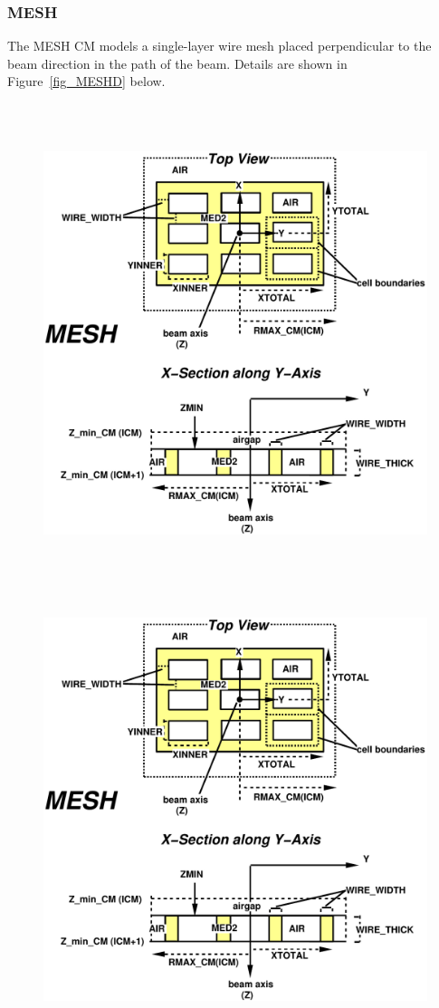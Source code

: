 \documentclass[12pt,twoside]{article}
\begin{document}
\subsubsection{MESH}
The MESH CM models a single-layer wire mesh placed perpendicular
to the beam direction in the path of the beam.  Details are shown in
Figure~\ref{fig_MESHD} below.
\begin{figure}[H]
\begin{center}
\leavevmode
\begin{latexonly}
\includegraphics[height=14cm]{figures/meshd}
\end{latexonly}
\begin{htmlonly}
\includegraphics[height=13cm]{figures/meshd}

\end{htmlonly}
\end{center}
\end{figure}
\end{document}
